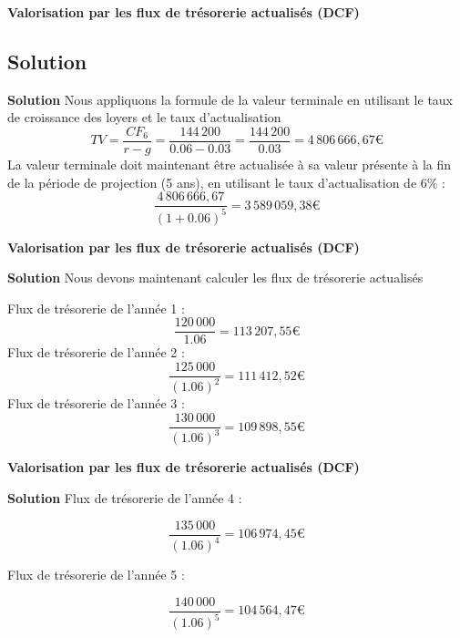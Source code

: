 \documentclass{beamer}
\begin{document}
\begin{frame}{\textbf{Valorisation par les flux de trésorerie actualisés (DCF)}}
\subsection{Solution}
\begin{exampleblock}{\textbf{Solution}}
Nous appliquons la formule de la valeur terminale en utilisant le taux de croissance des loyers et le taux d'actualisation
\[ TV = \frac{CF_6}{r-g}=\frac{144\,200}{0.06-0.03}=\frac{144\,200}{0.03}=4\,806\,666,67\text{€}\]
La valeur terminale doit maintenant être actualisée à sa valeur présente à la fin de la période de projection (5 ans), en utilisant le taux d'actualisation de 6\% :
\[ \frac{4\,806\,666,67}{(1+0.06)^5} = 3\,589\,059,38\text{€}\]

\end{exampleblock}


\end{frame}


\begin{frame}{\textbf{Valorisation par les flux de trésorerie actualisés (DCF)}}
	
	\begin{exampleblock}{\textbf{Solution}}
Nous devons maintenant calculer les flux de trésorerie actualisés
		
Flux de trésorerie de l'année 1 : 
\[ \frac{120\,000}{1.06}=113\,207,55\text{€}\]
Flux de trésorerie de l'année 2 : 
\[ \frac{125\,000}{(1.06)^2}=111\,412,52 \text{€}\]
Flux de trésorerie de l'année 3 : 
\[ \frac{130\,000}{(1.06)^3}=109\,898,55 \text{€}\]

	
		
	\end{exampleblock}
	
	
\end{frame}

\begin{frame}{\textbf{Valorisation par les flux de trésorerie actualisés (DCF)}}
	
	\begin{exampleblock}{\textbf{Solution}}
Flux de trésorerie de l'année 4 : 
		
\[ \frac{135\,000}{(1.06)^4}=106\,974,45\text{€} \]

Flux de trésorerie de l'année 5 : 

\[ \frac{140\,000}{(1.06)^5}=104\,564,47\text{€} \]	

	\end{exampleblock}

\end{frame}
\end{document}
